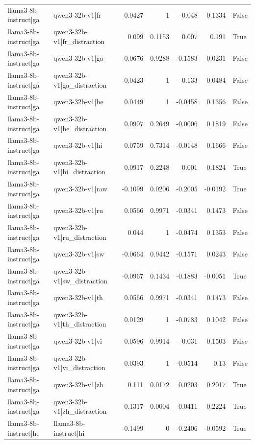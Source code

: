 \begin{table}
\begin{tabular}{l l r r r r l}
llama3-8b-instruct|ga & qwen3-32b-v1|fr & 0.0427 & 1 & -0.048 & 0.1334 & False \\
llama3-8b-instruct|ga & qwen3-32b-v1|fr_distraction & 0.099 & 0.1153 & 0.007 & 0.191 & True \\
llama3-8b-instruct|ga & qwen3-32b-v1|ga & -0.0676 & 0.9288 & -0.1583 & 0.0231 & False \\
llama3-8b-instruct|ga & qwen3-32b-v1|ga_distraction & -0.0423 & 1 & -0.133 & 0.0484 & False \\
llama3-8b-instruct|ga & qwen3-32b-v1|he & 0.0449 & 1 & -0.0458 & 0.1356 & False \\
llama3-8b-instruct|ga & qwen3-32b-v1|he_distraction & 0.0907 & 0.2649 & -0.0006 & 0.1819 & False \\
llama3-8b-instruct|ga & qwen3-32b-v1|hi & 0.0759 & 0.7314 & -0.0148 & 0.1666 & False \\
llama3-8b-instruct|ga & qwen3-32b-v1|hi_distraction & 0.0917 & 0.2248 & 0.001 & 0.1824 & True \\
llama3-8b-instruct|ga & qwen3-32b-v1|raw & -0.1099 & 0.0206 & -0.2005 & -0.0192 & True \\
llama3-8b-instruct|ga & qwen3-32b-v1|ru & 0.0566 & 0.9971 & -0.0341 & 0.1473 & False \\
llama3-8b-instruct|ga & qwen3-32b-v1|ru_distraction & 0.044 & 1 & -0.0474 & 0.1353 & False \\
llama3-8b-instruct|ga & qwen3-32b-v1|sw & -0.0664 & 0.9442 & -0.1571 & 0.0243 & False \\
llama3-8b-instruct|ga & qwen3-32b-v1|sw_distraction & -0.0967 & 0.1434 & -0.1883 & -0.0051 & True \\
llama3-8b-instruct|ga & qwen3-32b-v1|th & 0.0566 & 0.9971 & -0.0341 & 0.1473 & False \\
llama3-8b-instruct|ga & qwen3-32b-v1|th_distraction & 0.0129 & 1 & -0.0783 & 0.1042 & False \\
llama3-8b-instruct|ga & qwen3-32b-v1|vi & 0.0596 & 0.9914 & -0.031 & 0.1503 & False \\
llama3-8b-instruct|ga & qwen3-32b-v1|vi_distraction & 0.0393 & 1 & -0.0514 & 0.13 & False \\
llama3-8b-instruct|ga & qwen3-32b-v1|zh & 0.111 & 0.0172 & 0.0203 & 0.2017 & True \\
llama3-8b-instruct|ga & qwen3-32b-v1|zh_distraction & 0.1317 & 0.0004 & 0.0411 & 0.2224 & True \\
llama3-8b-instruct|he & llama3-8b-instruct|hi & -0.1499 & 0 & -0.2406 & -0.0592 & True \\

\end{tabular}
\end{table}
